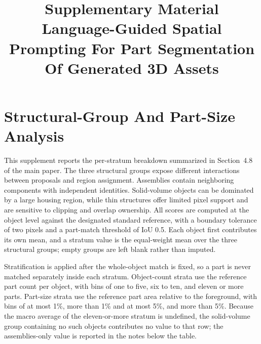 \documentclass[11pt]{article}
\title{\vspace{-1.2cm}\large Supplementary Material\\[0.3em]
Language-Guided Spatial Prompting For Part Segmentation Of Generated 3D Assets}
\author{}
\date{}
\begin{document}
\maketitle
\vspace{-1.4cm}

\section{Structural-Group And Part-Size Analysis}
\label{sec:s1}

This supplement reports the per-stratum breakdown summarized in Section~4.8 of the main paper. The three structural groups expose different interactions between proposals and region assignment. Assemblies contain neighboring components with independent identities. Solid-volume objects can be dominated by a large housing region, while thin structures offer limited pixel support and are sensitive to clipping and overlap ownership. All scores are computed at the object level against the designated standard reference, with a boundary tolerance of two pixels and a part-match threshold of IoU 0.5. Each object first contributes its own mean, and a stratum value is the equal-weight mean over the three structural groups; empty groups are left blank rather than imputed.

Stratification is applied after the whole-object match is fixed, so a part is never matched separately inside each stratum. Object-count strata use the reference part count per object, with bins of one to five, six to ten, and eleven or more parts. Part-size strata use the reference part area relative to the foreground, with bins of at most 1\%, more than 1\% and at most 5\%, and more than 5\%. Because the macro average of the eleven-or-more stratum is undefined, the solid-volume group containing no such objects contributes no value to that row; the assemblies-only value is reported in the notes below the table.
\end{document}
